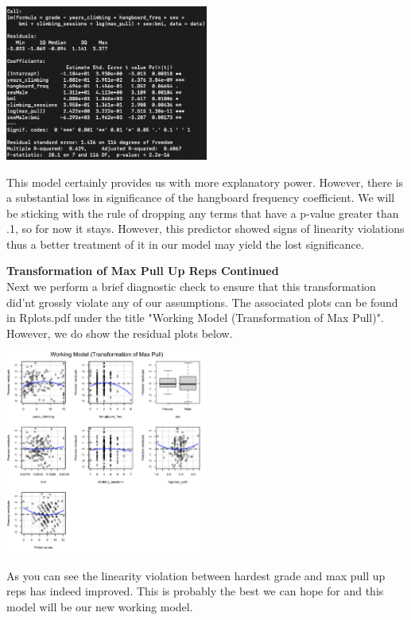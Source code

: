 \documentclass[11pt]{amsart}
\begin{document}
\begin{center}
\includegraphics[width=0.5\textwidth]{tran_mod1}
\end{center}

This model certainly provides us with more explanatory power.
However, there is a substantial loss in significance of the hangboard frequency coefficient.
We will be sticking with the rule of dropping any terms that have a p-value greater than .1, so for now it stays.
However, this predictor showed signs of linearity violations thus a better treatment of it in our model may yield the lost significance.



\newpage
{\bf\large Transformation of Max Pull Up Reps Continued}\\
Next we perform a brief diagnostic check to ensure that this transformation did'nt grossly violate any of our assumptions.
The associated plots can be found in Rplots.pdf under the title "Working Model (Transformation of Max Pull)".
However, we do show the residual plots below.

\begin{center}
\includegraphics[width=0.5\textwidth]{working_resid1}
\end{center}

As you can see the linearity violation between hardest grade and max pull up reps has indeed improved.
This is probably the best we can hope for and this model will be our new working model.
\end{document}
